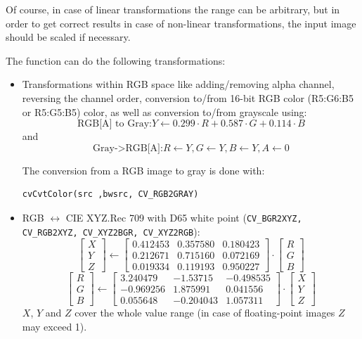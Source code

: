 Of course, in case of linear transformations the range can be
arbitrary, but in order to get correct results in case of non-linear
transformations, the input image should be scaled if necessary.

The function can do the following transformations:

\begin{itemize}
 \item Transformations within RGB space like adding/removing alpha channel, reversing the channel order, conversion to/from 16-bit RGB color (R5:G6:B5 or R5:G5:B5) color, as well as conversion to/from grayscale using:
 \[
 \text{RGB[A] to Gray:} Y \leftarrow 0.299 \cdot R + 0.587 \cdot G + 0.114 \cdot B
 \]
 and
 \[
 \text{Gray->RGB[A]:} R \leftarrow Y, G \leftarrow Y, B \leftarrow Y, A \leftarrow 0
 \]

The conversion from a RGB image to gray is done with:
\begin{lstlisting}
cvCvtColor(src ,bwsrc, CV_RGB2GRAY)
\end{lstlisting}

 \item RGB $\leftrightarrow$ CIE XYZ.Rec 709 with D65 white point (\texttt{CV\_BGR2XYZ, CV\_RGB2XYZ, CV\_XYZ2BGR, CV\_XYZ2RGB}):
 \[
 \begin{bmatrix}
 X \\
 Y \\
 Z
 \end{bmatrix}
 \leftarrow
 \begin{bmatrix}
0.412453 & 0.357580 & 0.180423\\
0.212671 & 0.715160 & 0.072169\\
0.019334 & 0.119193 & 0.950227
 \end{bmatrix}
 \cdot
 \begin{bmatrix}
 R \\
 G \\
 B
 \end{bmatrix}
 \]
 \[
 \begin{bmatrix}
 R \\
 G \\
 B
 \end{bmatrix}
 \leftarrow
 \begin{bmatrix}
3.240479 & -1.53715 & -0.498535\\
-0.969256 &  1.875991 & 0.041556\\
0.055648 & -0.204043 & 1.057311
 \end{bmatrix}
 \cdot
 \begin{bmatrix}
 X \\
 Y \\
 Z
 \end{bmatrix}
 \]
$X$, $Y$ and $Z$ cover the whole value range (in case of floating-point images $Z$ may exceed 1).


\end{itemize}
